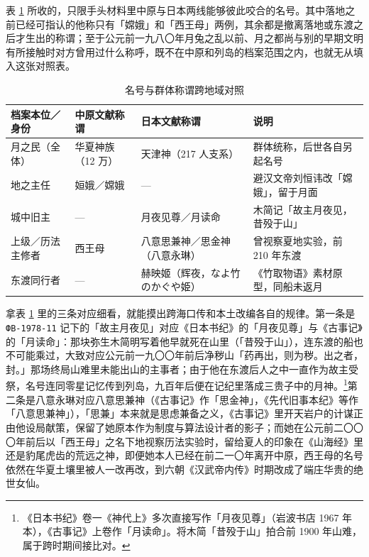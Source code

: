表 \ref{tab:names} 所收的，只限手头材料里中原与日本两线能够彼此咬合的名号。其中落地之前已经可指认的他称只有「嫦娥」和「西王母」两例，其余都是撤离落地或东渡之后才生出的称谓；至于公元前一九八〇年月兔之乱以前、月之都尚与别的早期文明有所接触时对方曾用过什么称呼，既不在中原和列岛的档案范围之内，也就无从填入这张对照表。

\begin{table}[htbp]
  \centering
  \caption{名号与群体称谓跨地域对照}
  \label{tab:names}
  \footnotesize
  \begin{tabular}{@{}p{25mm}p{26mm}p{32mm}p{39mm}@{}}
    \toprule
    档案本位／身份 & 中原文献称谓 & 日本文献称谓 & 说明 \\
    \midrule
    月之民（全体） & 华夏神族（12 万） & 天津神（217 人支系） & 群体统称，后世各自另起名号 \\
    地之主任 & 姮娥／嫦娥 & — & 避汉文帝刘恒讳改「嫦娥」，留于月面 \\
    城中旧主 & — & 月夜见尊／月读命 & 木简记「故主月夜见，昔殁于山」 \\
    上级／历法主修者 & 西王母 & 八意思兼神／思金神（八意永琳） & 曾视察夏地实验，前 210 年东渡 \\
    东渡同行者 & — & 赫映姬（辉夜，なよ竹のかぐや姫） & 《竹取物语》素材原型，同船未返月 \\
    \bottomrule
  \end{tabular}
\end{table}

拿表 \ref{tab:names} 里的三条对应细看，就能摸出跨海口传和本土改编各自的规律。第一条是 \texttt{ФВ-1978-11} 记下的「故主月夜见」对应《日本书纪》的「月夜见尊」与《古事记》的「月读命」：那块弥生木简明写着他早就死在山里（「昔殁于山」），连东渡的船也不可能乘过，大致对应公元前一九〇〇年前后净秽山「药再出，则为秽。出之者，封。」那场终局山难里未能出山的主事者；由于他在东渡后人之中一直作为故主受祭，名号连同零星记忆传到列岛，九百年后便在记纪里落成三贵子中的月神。\footnote{《日本书纪》卷一《神代上》多次直接写作「月夜见尊」（岩波书店 1967 年本），《古事记》上卷作「月读命」。将木简「昔殁于山」拍合前 1900 年山难，属于跨时期间接比对。}第二条是八意永琳对应八意思兼神（《古事记》作「思金神」，《先代旧事本纪》等作「八意思兼神」），「思兼」本来就是思虑兼备之义，《古事记》里开天岩户的计谋正由他设局献策，保留了她原本作为制度与算法设计者的影子；而她在公元前二〇〇〇年前后以「西王母」之名下地视察历法实验时，留给夏人的印象在《山海经》里还是豹尾虎齿的荒远之神，即便她本人已经在前二一〇年离开中原，西王母的名号依然在华夏土壤里被人一改再改，到六朝《汉武帝内传》时期改成了端庄华贵的绝世女仙。

